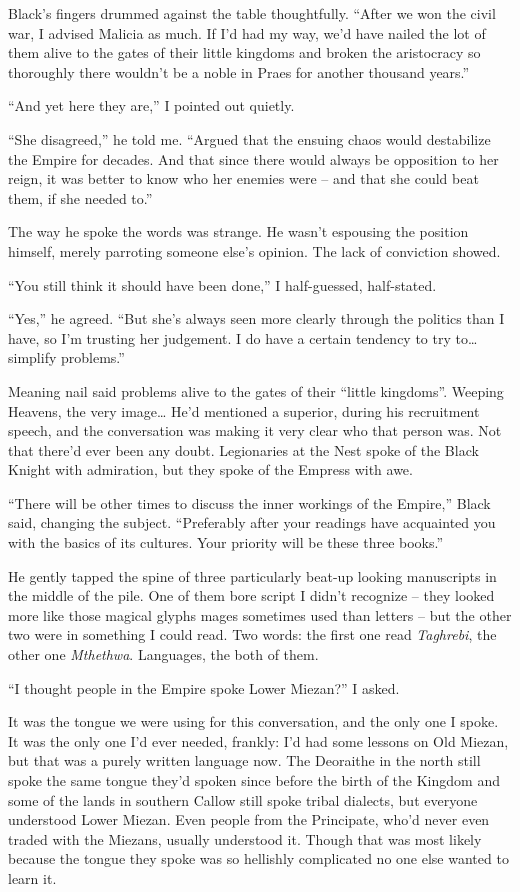\documentclass[12pt, openany]{book}
\begin{document}
Black’s fingers drummed against the table thoughtfully. “After we won the civil war, I advised Malicia as much. If I’d had my way, we’d have nailed the lot of them alive to the gates of their little kingdoms and broken the aristocracy so thoroughly there wouldn’t be a noble in Praes for another thousand years.”

“And yet here they are,” I pointed out quietly.

“She disagreed,” he told me. “Argued that the ensuing chaos would destabilize the Empire for decades. And that since there would always be opposition to her reign, it was better to know who her enemies were – and that she could beat them, if she needed to.”

The way he spoke the words was strange. He wasn’t espousing the position himself, merely parroting someone else’s opinion. The lack of conviction showed.

“You still think it should have been done,” I half-guessed, half-stated.

“Yes,” he agreed. “But she’s always seen more clearly through the politics than I have, so I’m trusting her judgement. I do have a certain tendency to try to… simplify problems.”

Meaning nail said problems alive to the gates of their “little kingdoms”. Weeping Heavens, the very image… He’d mentioned a superior, during his recruitment speech, and the conversation was making it very clear who that person was. Not that there’d ever been any doubt. Legionaries at the Nest spoke of the Black Knight with admiration, but they spoke of the Empress with awe.

“There will be other times to discuss the inner workings of the Empire,” Black said, changing the subject. “Preferably after your readings have acquainted you with the basics of its cultures. Your priority will be these three books.”

He gently tapped the spine of three particularly beat-up looking manuscripts in the middle of the pile. One of them bore script I didn’t recognize – they looked more like those magical glyphs mages sometimes used than letters – but the other two were in something I could read. Two words: the first one read \textit{Taghrebi}, the other one \textit{Mthethwa}. Languages, the both of them.

“I thought people in the Empire spoke Lower Miezan?” I asked. 

It was the tongue we were using for this conversation, and the only one I spoke. It was the only one I’d ever needed, frankly: I’d had some lessons on Old Miezan, but that was a purely written language now. The Deoraithe in the north still spoke the same tongue they’d spoken since before the birth of the Kingdom and some of the lands in southern Callow still spoke tribal dialects, but everyone understood Lower Miezan. Even people from the Principate, who’d never even traded with the Miezans, usually understood it. Though that was most likely because the tongue they spoke was so hellishly complicated no one else wanted to learn it.
\end{document}

